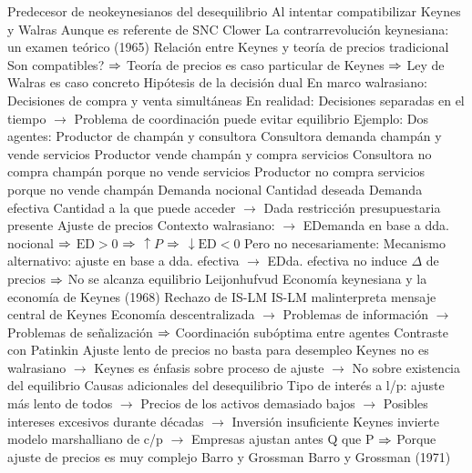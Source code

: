 \documentclass{nuevotema}
\begin{document}
\begin{esquemal}
				\4[$\then$] Predecesor de neokeynesianos del desequilibrio
				\4[] Al intentar compatibilizar Keynes y Walras
				\4[] Aunque es referente de SNC
			\3 Clower
				\4 La contrarrevolución keynesiana: un examen teórico (1965)
				\4[] Relación entre Keynes y teoría de precios tradicional
				\4[] Son compatibles?
				\4[] $\then$ Teoría de precios es caso particular de Keynes
				\4[] $\then$ Ley de Walras es caso concreto
				\4 Hipótesis de la decisión dual
				\4[] En marco walrasiano:
				\4[] Decisiones de compra y venta simultáneas
				\4[] En realidad:
				\4[] Decisiones separadas en el tiempo
				\4[] $\to$ Problema de coordinación puede evitar equilibrio
				\4 Ejemplo:
				\4[] Dos agentes:
				\4[] Productor de champán y consultora
				\4[] Consultora demanda champán y vende servicios
				\4[] Productor vende champán y compra servicios
				\4[] Consultora no compra champán porque no vende servicios
				\4[] Productor no compra servicios porque no vende champán
				\4 Demanda nocional
				\4[] Cantidad deseada
				\4 Demanda efectiva
				\4[] Cantidad a la que puede acceder
				\4[] $\to$ Dada restricción presupuestaria presente
				\4 Ajuste de precios
				\4[] Contexto walrasiano:
				\4[] $\to$ EDemanda en base a dda. nocional
				\4[] $\then$ $\text{ED} > 0$ $\then$ $\uparrow P$ $\then$ $\downarrow \text{ED} < 0$
				\4[] Pero no necesariamente:
				\4[] Mecanismo alternativo: ajuste en base a dda. efectiva
				\4[] $\to$ EDda. efectiva no induce $\Delta$ de precios
				\4[] $\then$ No se alcanza equilibrio
				\4[] 
			\3 Leijonhufvud
				\4 Economía keynesiana y la economía de Keynes (1968)
				\4 Rechazo de IS-LM
				\4[] IS-LM malinterpreta mensaje central de Keynes
				\4 Economía descentralizada
				\4[] $\to$ Problemas de información
				\4[] $\to$ Problemas de señalización
				\4[] $\then$ Coordinación subóptima entre agentes
				\4 Contraste con Patinkin
				\4[] Ajuste lento de precios no basta para desempleo
				\4[] Keynes no es walrasiano
				\4[] $\to$ Keynes es énfasis sobre proceso de ajuste
				\4[] $\to$ No sobre existencia del equilibrio
				\4 Causas adicionales del desequilibrio
				\4[] Tipo de interés a l/p: ajuste más lento de todos
				\4[] $\to$ Precios de los activos demasiado bajos
				\4[] $\to$ Posibles intereses excesivos durante décadas
				\4[] $\to$ Inversión insuficiente
				\4[] Keynes invierte modelo marshalliano de c/p
				\4[] $\to$ Empresas ajustan antes Q que P
				\4[] $\then$ Porque ajuste de precios es muy complejo
			\3 Barro y Grossman
				\4 Barro y Grossman (1971)

\end{esquemal}
\end{document}
